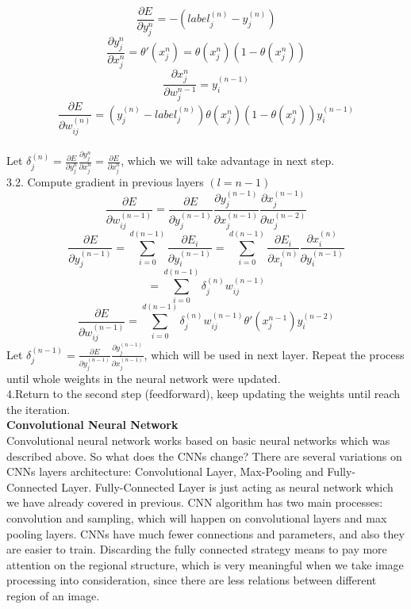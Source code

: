 \documentclass[11pt,letterpaper]{article}
\begin{document}
$$\frac{\partial E}{\partial y^{n}_{j}} = -(label^{(n)}_{j}-y^{(n)}_{j})$$
$$\frac{\partial y^{n}_{j}}{\partial x^{n}_{j}} = \theta'(x^{n}_{j}) = \theta(x^{n}_{j})(1-\theta(x^{n}_{j}))$$
$$\frac{\partial x^{n}_{j}}{\partial w^{n-1}_{j}} = y^{(n-1)}_{i}$$
$$\frac{\partial E}{\partial w^{(n)}_{ij}} = (y^{(n)}_{j}-label^{(n)}_{j})\theta(x^{n}_{j})(1-\theta(x^{n}_{j}))y^{(n-1)}_{i}$$
\\Let $\delta^{(n)}_{j} = \frac{\partial E}{\partial y^{n}_{j}}\frac{\partial y^{n}_{j}}{\partial x^{n}_{j}}=\frac{\partial E}{\partial x^{n}_{j}}$, which we will take advantage in next step.\\
3.2. Compute gradient in previous layers $(l = n-1)$
$$\frac{\partial E}{\partial w^{(n-1)}_{ij}} = \frac{\partial E}{\partial y^{(n-1)}_{j}} \frac{\partial y^{(n-1)}_{j}}{\partial x^{(n-1)}_{j}} \frac{\partial x^{(n-1)}_{j}}{\partial w^{(n-2)}_{j}}$$
$$\frac{\partial E}{\partial y^{(n-1)}_{j}}=\sum^{d(n-1)}_{i=0}\frac{\partial E_{i}}{\partial y^{(n-1)}_{i}}=\sum^{d(n-1)}_{i=0}\frac{\partial E_{i}}{\partial x^{(n)}_{i}}\frac{\partial x^{(n)}_{i}}{\partial y^{(n-1)}_{i}} $$
$$= \sum^{d(n-1)}_{i=0} \delta^{(n)}_{j} w^{(n-1)}_{ij}$$
$$\frac{\partial E}{\partial w^{(n-1)}_{ij}} = \sum^{d(n-1)}_{i=0} \delta^{(n)}_{j} w^{(n-1)}_{ij} \theta'(x^{n-1}_{j})y^{(n-2)}_{i}$$
Let $\delta^{(n-1)}_{j} =\frac{\partial E}{\partial y^{(n-1)}_{j}} \frac{\partial y^{(n-1)}_{j}}{\partial x^{(n-1)}_{j}}$, which will be used in next layer. Repeat the process until whole weights in the neural network were updated.\\
4.Return to the second step (feedforward), keep updating the weights until reach the iteration.\\
{\bf Convolutional Neural Network}\\
Convolutional neural network works based on basic neural networks which was described above. So what does the CNNs change? There are several variations on CNNs layers architecture: Convolutional Layer, Max-Pooling and Fully-Connected Layer. Fully-Connected Layer is just acting as neural network which we have already covered in previous. CNN algorithm has two main processes: convolution and sampling, which will happen on convolutional layers and max pooling layers. CNNs have much fewer connections and parameters, and also they are easier to train. Discarding the fully connected strategy means to pay more attention on the regional structure, which is very meaningful when we take image processing into consideration, since there are less relations between different region of an image. \\
\end{document}
